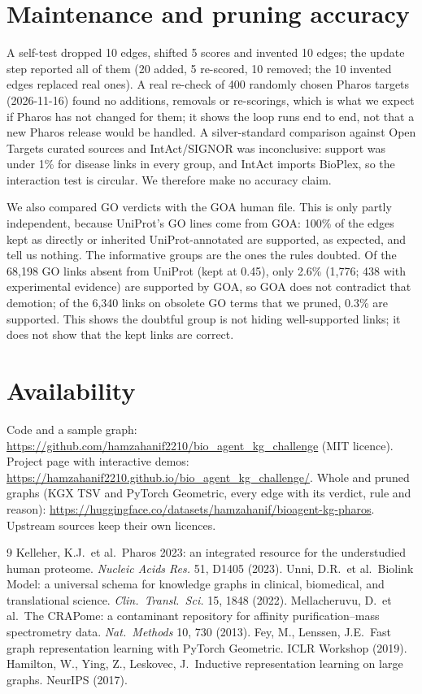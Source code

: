 \documentclass[11pt]{article}
\begin{document}
\section{Maintenance and pruning accuracy}
A self-test dropped 10 edges, shifted 5 scores and invented 10 edges; the update step reported all of them (20 added, 5 re-scored, 10 removed; the 10 invented edges replaced real ones). A real re-check of 400 randomly chosen Pharos targets (2026-11-16) found no additions, removals or re-scorings, which is what we expect if Pharos has not changed for them; it shows the loop runs end to end, not that a new Pharos release would be handled. A silver-standard comparison against Open Targets curated sources and IntAct/SIGNOR was inconclusive: support was under 1\% for disease links in every group, and IntAct imports BioPlex, so the interaction test is circular. We therefore make no accuracy claim.

We also compared GO verdicts with the GOA human file. This is only partly independent, because UniProt's GO lines come from GOA: 100\% of the edges kept as directly or inherited UniProt-annotated are supported, as expected, and tell us nothing. The informative groups are the ones the rules doubted. Of the 68,198 GO links absent from UniProt (kept at 0.45), only 2.6\% (1,776; 438 with experimental evidence) are supported by GOA, so GOA does not contradict that demotion; of the 6,340 links on obsolete GO terms that we pruned, 0.3\% are supported. This shows the doubtful group is not hiding well-supported links; it does not show that the kept links are correct.


\section{Availability}
Code and a sample graph: \url{https://github.com/hamzahanif2210/bio_agent_kg_challenge} (MIT licence). Project page with interactive demos: \url{https://hamzahanif2210.github.io/bio_agent_kg_challenge/}. Whole and pruned graphs (KGX TSV and PyTorch Geometric, every edge with its verdict, rule and reason): \url{https://huggingface.co/datasets/hamzahanif/bioagent-kg-pharos}. Upstream sources keep their own licences.

\begin{thebibliography}{9}\small
{} Kelleher, K.J.\ et al.\ Pharos 2023: an integrated resource for the understudied human proteome. \emph{Nucleic Acids Res.} 51, D1405 (2023).
 Unni, D.R.\ et al.\ Biolink Model: a universal schema for knowledge graphs in clinical, biomedical, and translational science. \emph{Clin.\ Transl.\ Sci.} 15, 1848 (2022).
 Mellacheruvu, D.\ et al.\ The CRAPome: a contaminant repository for affinity purification--mass spectrometry data. \emph{Nat.\ Methods} 10, 730 (2013).
 Fey, M., Lenssen, J.E.\ Fast graph representation learning with PyTorch Geometric. ICLR Workshop (2019).
 Hamilton, W., Ying, Z., Leskovec, J.\ Inductive representation learning on large graphs. NeurIPS (2017).
\end{thebibliography}
\end{document}
